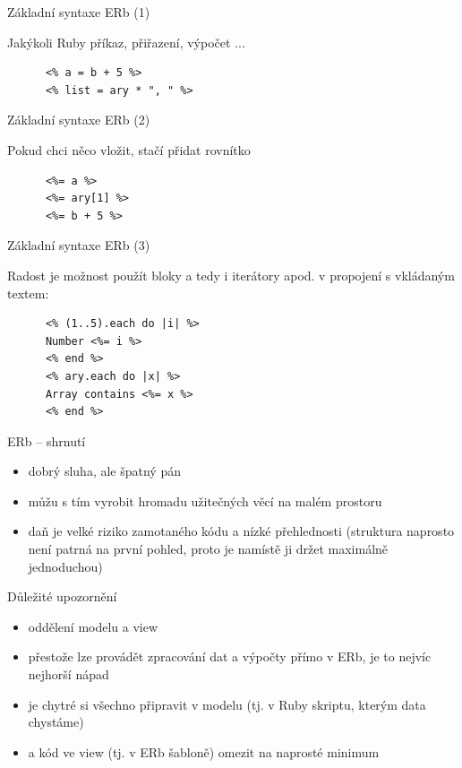 \documentclass{beamer}
\begin{document}
\begin{frame}[fragile]{Základní syntaxe ERb (1)}
  \begin{block}{ }
    Jakýkoli Ruby příkaz, přiřazení, výpočet ...
    \scriptsize
    \begin{verbatim}
      <% a = b + 5 %>
      <% list = ary * ", " %>
    \end{verbatim}
  \end{block}
\end{frame}

\begin{frame}[fragile]{Základní syntaxe ERb (2)}
  \begin{block}{ }
    Pokud chci něco vložit, stačí přidat rovnítko
    \scriptsize
    \begin{verbatim}
      <%= a %>
      <%= ary[1] %>
      <%= b + 5 %>
    \end{verbatim}
  \end{block}
\end{frame}

\begin{frame}[fragile]{Základní syntaxe ERb (3)}
  \begin{block}{ }
    Radost je možnost použít bloky a tedy i iterátory apod. v propojení s vkládaným textem:
    \scriptsize
    \begin{verbatim}
      <% (1..5).each do |i| %>
      Number <%= i %>
      <% end %>
      <% ary.each do |x| %>
      Array contains <%= x %>
      <% end %>
    \end{verbatim}
  \end{block}
\end{frame}

\begin{frame}{ERb -- shrnutí}
  \begin{itemize}
    \item dobrý sluha, ale špatný pán
    \item můžu s tím vyrobit hromadu užitečných věcí na malém prostoru
    \item daň je velké riziko zamotaného kódu a nízké přehlednosti (struktura naprosto není patrná na první pohled, proto je namístě ji držet maximálně jednoduchou)
  \end{itemize}
\end{frame}

\begin{frame}{Důležité upozornění}
  \begin{itemize}
    \item oddělení modelu a view
    \item přestože lze provádět zpracování dat a výpočty přímo v ERb, je to nejvíc nejhorší nápad
    \item je chytré si všechno připravit v modelu (tj. v Ruby skriptu, kterým data chystáme)
    \item a kód ve view (tj. v ERb šabloně) omezit na naprosté minimum
  \end{itemize}
\end{frame}
\end{document}
